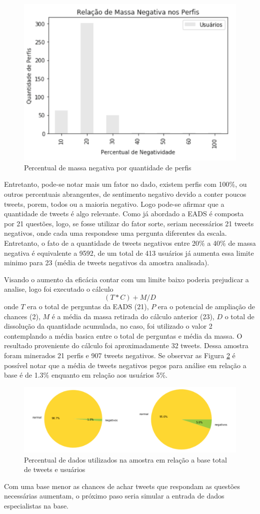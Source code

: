 \begin{figure}[!ht]
    \centering
    \includegraphics[width=.4\textwidth]{imagens/relacao-massa-neg.png}
    \caption{Percentual de massa negativa por quantidade de perfis}
    \label{fig:negative-pop-relation}
\end{figure}

Entretanto, pode-se notar mais um fator no dado, existem perfis com 100\%, ou outros percentuais abrangentes, de sentimento negativo devido a conter poucos tweets, porem, todos ou a maioria negativo. Logo pode-se afirmar que a quantidade de tweets é algo relevante. Como já abordado a EADS é composta por 21 questões, logo, se fosse utilizar do fator sorte, seriam necessários 21 tweets negativos, onde cada uma respondese uma pergunta diferentes da escala. Entretanto, o fato de a quantidade de tweets negativos entre 20\% a 40\% de massa negativa é equivalente a 9592, de um total de 413 usuários já aumenta essa limite minimo para 23 (média de tweets negativos da amostra analisada). 

Visando o aumento da eficácia contar com um limite baixo poderia prejudicar a analise, logo foi executado o cálculo \[ (T * C) + M / D \] onde \(T\) era o total de perguntas da EADS (21), \(P\) era o potencial de ampliação de chances (2), \(M\) é a média da massa retirada do cálculo anterior (23), \(D\) o total de dissolução da quantidade acumulada, no caso, foi utilizado o valor 2 contemplando a média basica entre o total de perguntas e média da massa. O resultado proveniente do cálculo foi aproximadamente 32 tweets. Dessa amostra foram minerados 21 perfis e 907 tweets negativos. Se observar as Figura \ref{fig:sample-relation} é possível notar que a média de tweets negativos pegos para análise em relação a base é de 1.3\% enquanto em relação aos usuários 5\%.

\begin{figure}[!ht]
    \centering
    \includegraphics[width=.6\textwidth]{imagens/relacao-amostra.png}
    \caption{Percentual de dados utilizados na amostra em relação a base total de tweets e usuários}
    \label{fig:sample-relation}
\end{figure}

Com uma base menor as chances de achar tweets que respondam as questões necessárias aumentam, o próximo paso seria simular a entrada de dados especialistas na base.
